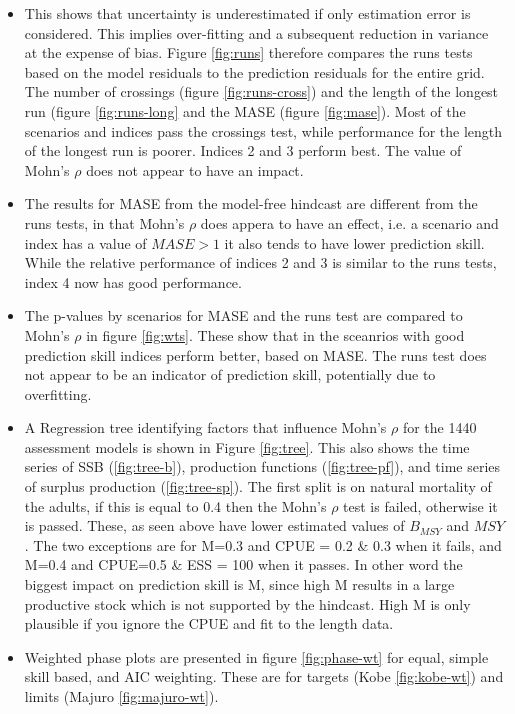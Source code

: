 \begin{itemize}
   \item This shows that uncertainty is underestimated if only estimation error is considered. This implies over-fitting and a subsequent reduction in variance at the expense of bias. Figure \ref{fig:runs} therefore compares the runs tests based on the model residuals to the prediction residuals for the entire grid. The number of crossings (figure \ref{fig:runs-cross}) and the length of the longest run (figure \ref{fig:runs-long} and the MASE (figure \ref{fig:mase}). Most of the scenarios and indices pass the crossings test, while performance for the length of the longest run is poorer. Indices 2 and 3 perform best. The value of Mohn's $\rho$ does not appear to have an impact. 
   
   \item The results for MASE from the model-free hindcast are different from the runs tests, in that Mohn's $\rho$ does appera to have an effect, i.e. a scenario and index has a value of $MASE \gt 1$ it also tends to have lower prediction skill.  While the relative performance of indices 2 and 3 is similar to the runs tests, index 4 now has good performance.
   
   \item The p-values by scenarios for MASE and the runs test are compared to Mohn's $\rho$ in figure \ref{fig:wts}. These show that in the sceanrios with good prediction skill indices perform better, based on MASE. The runs test does not appear to be an indicator of prediction skill, potentially due to overfitting. 

   \item A Regression tree identifying factors that influence Mohn's $\rho$ for the 1440 assessment models is shown in Figure \ref{fig:tree}. This also shows the time series of SSB (\ref{fig:tree-b}), production functions (\ref{fig:tree-pf}), and time series of surplus production (\ref{fig:tree-sp}). The first split is on natural mortality of the adults, if this is equal to 0.4 then the Mohn's $\rho$ test is failed, otherwise it is passed. These, as seen above have lower estimated values of $B_{MSY}$ and $MSY$. The two exceptions are for M=0.3 and CPUE = 0.2 \& 0.3 when it fails, and M=0.4 and CPUE=0.5 \& ESS = 100 when it passes. In other word the biggest impact on prediction skill is M, since high M results in a large productive stock which is not supported by the hindcast. High M is only plausible if you ignore the CPUE and fit to the length data. 
   
  \item Weighted phase plots are presented in figure \ref{fig:phase-wt} for equal, simple skill based, and AIC weighting. These are for targets (Kobe \ref{fig:kobe-wt}) and limits (Majuro \ref{fig:majuro-wt}). 


\end{itemize}
